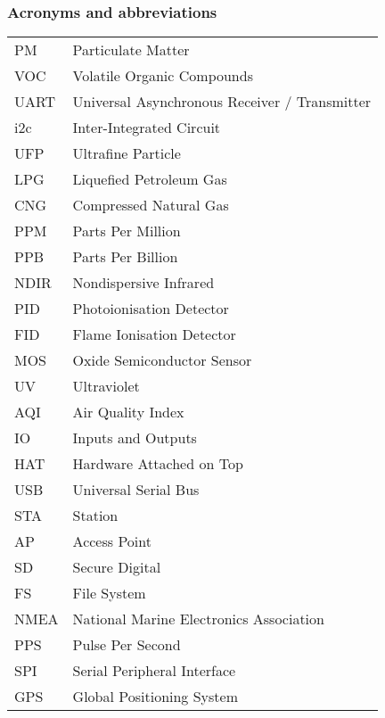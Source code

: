 \subsubsection*{Acronyms and abbreviations}

\begingroup
\renewcommand{\arraystretch}{1.2}
\begin{tabular}{@{}p{2.5cm} l}

	PM		& Particulate Matter\\
	VOC		& Volatile Organic Compounds\\
	UART	& Universal Asynchronous Receiver / Transmitter\\
	i2c		& Inter-Integrated Circuit\\
	UFP		& Ultrafine Particle\\
	LPG		& Liquefied Petroleum Gas\\
	CNG 	& Compressed Natural Gas\\
	PPM		& Parts Per Million\\
	PPB		& Parts Per Billion\\
	NDIR	& Nondispersive Infrared\\
	PID		& Photoionisation Detector\\
	FID		& Flame Ionisation Detector\\
	MOS		& Oxide Semiconductor Sensor\\
	UV		& Ultraviolet\\
	AQI		& Air Quality Index\\
	IO		& Inputs and Outputs\\
	HAT		& Hardware Attached on Top\\
	USB		& Universal Serial Bus\\
	STA		& Station\\
	AP		& Access Point\\
	SD		& Secure Digital\\
	FS		& File System\\
	NMEA	& National Marine Electronics Association\\
	PPS		& Pulse Per Second\\
	SPI		& Serial Peripheral Interface\\
	GPS		& Global Positioning System\\
	
	
\end{tabular}
\endgroup
